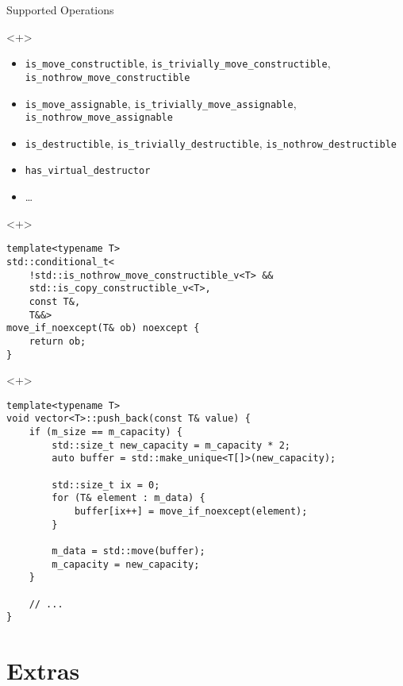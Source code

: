 \documentclass[table]{beamer}
\begin{document}
\begin{frame}[fragile]{Supported Operations}
  \begin{onlyenv}<+>
    \begin{itemize}
    \item \texttt{is\_move\_constructible},
      \texttt{is\_trivially\_move\_constructible},
      \texttt{is\_nothrow\_move\_constructible}

    \item \texttt{is\_move\_assignable},
      \texttt{is\_trivially\_move\_assignable},
      \texttt{is\_nothrow\_move\_assignable}

    \item \texttt{is\_destructible}, \texttt{is\_trivially\_destructible},
      \texttt{is\_nothrow\_destructible}

    \item \texttt{has\_virtual\_destructor}

    \item \ldots
    \end{itemize}
  \end{onlyenv}

  \begin{onlyenv}<+>
    \begin{verbatim}
template<typename T>
std::conditional_t<
    !std::is_nothrow_move_constructible_v<T> &&
    std::is_copy_constructible_v<T>,
    const T&,
    T&&>
move_if_noexcept(T& ob) noexcept {
    return ob;
}
    \end{verbatim}
  \end{onlyenv}

  \begin{onlyenv}<+>
    \begin{verbatim}
template<typename T>
void vector<T>::push_back(const T& value) {
    if (m_size == m_capacity) {
        std::size_t new_capacity = m_capacity * 2;
        auto buffer = std::make_unique<T[]>(new_capacity);

        std::size_t ix = 0;
        for (T& element : m_data) {
            buffer[ix++] = move_if_noexcept(element);
        }

        m_data = std::move(buffer);
        m_capacity = new_capacity;
    }

    // ...
}
    \end{verbatim}
  \end{onlyenv}
\end{frame}

\section{Extras}
\end{document}
